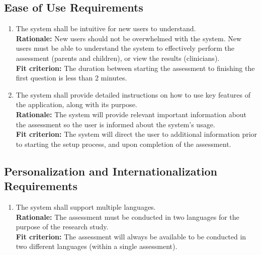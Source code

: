 \documentclass[12pt]{article}
\begin{document}
\subsection{Ease of Use Requirements}
\begin{enumerate}[{UH-EOU}1. ]
  \item The system shall be intuitive for new users to understand.\\
  \textbf{Rationale: }New users should not be overwhelmed with the system. New users must be able to understand the system to effectively perform the assessment (parents and children), or view the results (clinicians).\\
  \textbf{Fit criterion: }The duration between starting the assessment to finishing the first question is less than 2 minutes.
  \item The system shall provide detailed instructions on how to use key features of the application, along with its purpose.\\
  \textbf{Rationale: }The system will provide relevant important information about the assessment so the user is informed about the system's usage.\\ 
  \textbf{Fit criterion: }The system will direct the user to additional information prior to starting the setup process, and upon completion of the assessment.
\end{enumerate}
\subsection{Personalization and Internationalization Requirements}
\begin{enumerate}[{UH-PI}1. ]
  \item The system shall support multiple languages.\\
  \textbf{Rationale: }The assessment must be conducted in two languages for the purpose of the research study.\\
  \textbf{Fit criterion: }The assessment will always be available to be conducted in two different languages (within a single assessment).
\end{enumerate}
\end{document}
